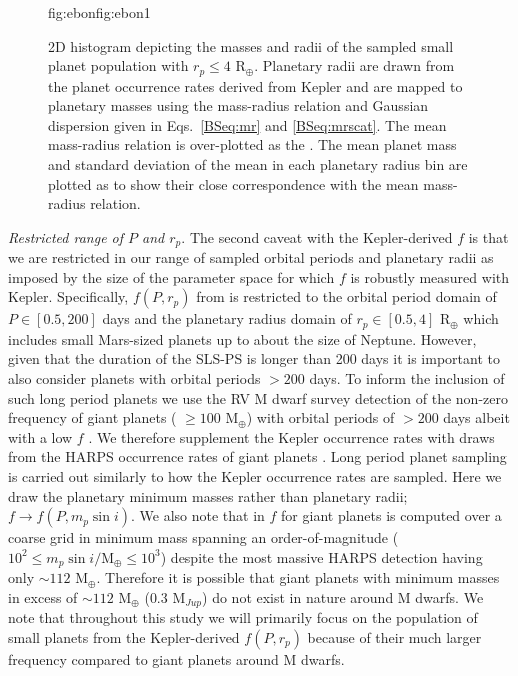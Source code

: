 \begin{figure}
\begin{ocg}{fig:ebon}{fig:ebon}{1}
  \end{ocg}
  \hspace{-0.6\hsize}%
  \caption[Masses and radii of synthetic planets in the simulated SLS-PS.]
    {\small 2D histogram depicting the masses and radii of the sampled
    small planet population with $r_p \leq 4$ R$_{\oplus}$. Planetary radii are drawn from the
    planet occurrence rates derived from Kepler and are mapped to 
    planetary masses using the mass-radius relation and Gaussian
    dispersion given in Eqs.~\ref{BSeq:mr} and \ref{BSeq:mrscat}. The mean
    mass-radius relation is over-plotted as the 
    . The mean
    planet mass and standard deviation of the mean in each planetary radius bin are plotted as
     to
    show their close correspondence with the mean mass-radius relation.}
  \label{BSfig:mr}
\end{figure}

\emph{Restricted range of $P$ and $r_p$}. The second caveat with the Kepler-derived $f$ is that
we are restricted in
our range of sampled orbital periods and planetary radii as imposed by the size of the parameter space
for which $f$ is robustly measured with Kepler. Specifically, $f(P,r_p)$ from \cite{dressing15a}
is restricted to the orbital period domain of $P \in [0.5,200]$ days and the planetary radius domain of 
$r_p \in [0.5,4]$ R$_{\oplus}$ which includes small Mars-sized planets up to about the size of Neptune. 
However, given that the duration of the SLS-PS is longer than 200 days it is important to also consider planets
with orbital periods $> 200$ days. To inform the inclusion of such long period planets we use the RV M dwarf
survey detection of the non-zero frequency of giant planets 
(\msini{} $\ge 100$ M$_{\oplus}$) with orbital 
periods of $>200$ days albeit with a low $f$ \citep[$\lesssim 5$\%;][]{bonfils13}.
We therefore supplement the Kepler occurrence rates with draws 
from the HARPS occurrence rates of giant planets \citep{bonfils13}.
Long period planet sampling is carried out similarly to how the Kepler occurrence rates are sampled.
Here we draw the planetary minimum masses rather than planetary radii; $f \to f(P,m_p\sin{i})$.
We also note that in \cite{bonfils13} $f$ for giant planets is computed over a coarse grid
in minimum mass spanning an order-of-magnitude 
($10^2 \le m_p\sin{i}/\text{M}_{\oplus} \le 10^3$) despite the most massive HARPS detection having only
\msini{} $\sim 112$ M$_{\oplus}$. Therefore it is possible that giant planets with minimum masses in excess
of $\sim 112$ M$_{\oplus}$ ($0.3$ M$_{Jup}$) do not exist in nature around M dwarfs.
We note that throughout this study we will
primarily focus on the population of small planets from the Kepler-derived $f(P,r_p)$ 
because of their much larger frequency compared to giant planets around M dwarfs.

